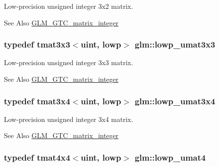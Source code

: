 Low-\/precision unsigned integer 3x2 matrix. \begin{DoxySeeAlso}{See Also}
\hyperlink{group__gtc__matrix__integer}{G\-L\-M\-\_\-\-G\-T\-C\-\_\-matrix\-\_\-integer} 
\end{DoxySeeAlso}
\hypertarget{group__gtc__matrix__integer_gab27a50de8b11ec09b2f5cf1cf4c1a062}{
\subsubsection[{lowp\-\_\-umat3x3}]{\setlength{\rightskip}{0pt plus 5cm}typedef tmat3x3$<$uint, lowp$>$ {\bf glm\-::lowp\-\_\-umat3x3}}}\label{group__gtc__matrix__integer_gab27a50de8b11ec09b2f5cf1cf4c1a062}
Low-\/precision unsigned integer 3x3 matrix. \begin{DoxySeeAlso}{See Also}
\hyperlink{group__gtc__matrix__integer}{G\-L\-M\-\_\-\-G\-T\-C\-\_\-matrix\-\_\-integer} 
\end{DoxySeeAlso}
\hypertarget{group__gtc__matrix__integer_ga2ed807c71afb8c0f8742bb03e9f71829}{
\subsubsection[{lowp\-\_\-umat3x4}]{\setlength{\rightskip}{0pt plus 5cm}typedef tmat3x4$<$uint, lowp$>$ {\bf glm\-::lowp\-\_\-umat3x4}}}\label{group__gtc__matrix__integer_ga2ed807c71afb8c0f8742bb03e9f71829}
Low-\/precision unsigned integer 3x4 matrix. \begin{DoxySeeAlso}{See Also}
\hyperlink{group__gtc__matrix__integer}{G\-L\-M\-\_\-\-G\-T\-C\-\_\-matrix\-\_\-integer} 
\end{DoxySeeAlso}
\hypertarget{group__gtc__matrix__integer_gaa430d894a3290d551061d0d77c017cec}{
\subsubsection[{lowp\-\_\-umat4}]{\setlength{\rightskip}{0pt plus 5cm}typedef tmat4x4$<$uint, lowp$>$ {\bf glm\-::lowp\-\_\-umat4}}}\label{group__gtc__matrix__integer_gaa430d894a3290d551061d0d77c017cec}
